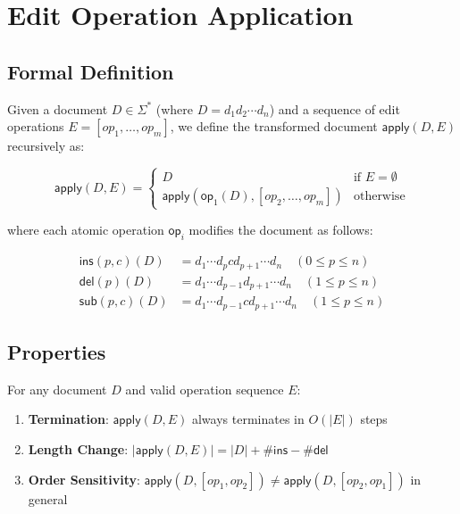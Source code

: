 \documentclass{article}
\begin{document}
\section{Edit Operation Application}
\label{sec:edit-application}

\subsection{Formal Definition}

Given a document $D \in \Sigma^*$ (where $D = d_1d_2\cdots d_n$) and a sequence of edit operations $E = [op_1, \ldots, op_m]$, we define the transformed document $\mathsf{apply}(D, E)$ recursively as:

\[
\mathsf{apply}(D, E) = 
\begin{cases}
D & \text{if } E = \emptyset \\
\mathsf{apply}(\mathsf{op}_1(D), [op_2, \ldots, op_m]) & \text{otherwise}
\end{cases}
\]

where each atomic operation $\mathsf{op}_i$ modifies the document as follows:

\begin{align*}
\mathsf{ins}(p,c)(D) &= d_1\cdots d_p c d_{p+1}\cdots d_n \quad (0 \leq p \leq n) \\
\mathsf{del}(p)(D) &= d_1\cdots d_{p-1} d_{p+1}\cdots d_n \quad (1 \leq p \leq n) \\
\mathsf{sub}(p,c)(D) &= d_1\cdots d_{p-1} c d_{p+1}\cdots d_n \quad (1 \leq p \leq n)
\end{align*}

\subsection{Properties}

\begin{center}
For any document $D$ and valid operation sequence $E$:
\begin{enumerate}
    \item \textbf{Termination}: $\mathsf{apply}(D, E)$ always terminates in $O(|E|)$ steps
    \item \textbf{Length Change}: $|\mathsf{apply}(D, E)| = |D| + \#\mathsf{ins} - \#\mathsf{del}$
    \item \textbf{Order Sensitivity}: $\mathsf{apply}(D, [op_1, op_2]) \neq \mathsf{apply}(D, [op_2, op_1])$ in general
\end{enumerate}
\end{center}
\end{document}
